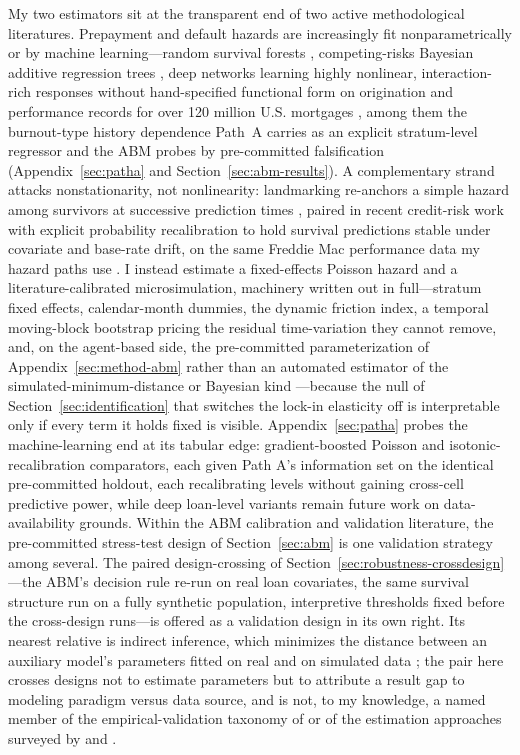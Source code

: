 My two estimators sit at the transparent end of two active methodological literatures. Prepayment and default hazards are increasingly fit nonparametrically or by machine learning---random survival forests \citep{ishwaran2008}, competing-risks Bayesian additive regression trees \citep{sparapani2020}, deep networks learning highly nonlinear, interaction-rich responses without hand-specified functional form on origination and performance records for over 120 million U.S. mortgages \citep{sadhwani2021}, among them the burnout-type history dependence Path~A carries as an explicit stratum-level regressor and the ABM probes by pre-committed falsification (Appendix~\ref{sec:patha} and Section~\ref{sec:abm-results}). A complementary strand attacks nonstationarity, not nonlinearity: landmarking re-anchors a simple hazard among survivors at successive prediction times \citep{vanhouwelingen2007,putter2022}, paired in recent credit-risk work with explicit probability recalibration to hold survival predictions stable under covariate and base-rate drift, on the same Freddie Mac performance data my hazard paths use \citep{peng2026}. I instead estimate a fixed-effects Poisson hazard and a literature-calibrated microsimulation, machinery written out in full---stratum fixed effects, calendar-month dummies, the dynamic friction index, a temporal moving-block bootstrap pricing the residual time-variation they cannot remove, and, on the agent-based side, the pre-committed parameterization of Appendix~\ref{sec:method-abm} rather than an automated estimator of the simulated-minimum-distance or Bayesian kind \citep{grazzini2017,platt2020}---because the null of Section~\ref{sec:identification} that switches the lock-in elasticity off is interpretable only if every term it holds fixed is visible. Appendix~\ref{sec:patha} probes the machine-learning end at its tabular edge: gradient-boosted Poisson and isotonic-recalibration comparators, each given Path A's information set on the identical pre-committed holdout, each recalibrating levels without gaining cross-cell predictive power, while deep loan-level variants remain future work on data-availability grounds. Within the ABM calibration and validation literature, the pre-committed stress-test design of Section~\ref{sec:abm} is one validation strategy among several. The paired design-crossing of Section~\ref{sec:robustness-crossdesign}---the ABM's decision rule re-run on real loan covariates, the same survival structure run on a fully synthetic population, interpretive thresholds fixed before the cross-design runs---is offered as a validation design in its own right. Its nearest relative is indirect inference, which minimizes the distance between an auxiliary model's parameters fitted on real and on simulated data \citep{platt2020}; the pair here crosses designs not to estimate parameters but to attribute a result gap to modeling paradigm versus data source, and is not, to my knowledge, a named member of the empirical-validation taxonomy of \citet{fagiolo2007} or of the estimation approaches surveyed by \citet{grazzini2017} and \citet{platt2020}.

